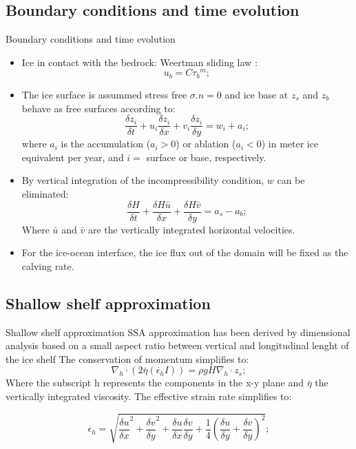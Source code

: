 \documentclass[11pt]{beamer}
\begin{document}
	\subsection{Boundary conditions and time evolution}
		\begin{frame}{Boundary conditions and time evolution}
		\justifying
			\begin{itemize}
				\item Ice in contact with the bedrock: Weertman sliding law \cite[]{weertman1974stability}:
				\begin{equation}
					u_b=C{\tau_b}^m;
				\end{equation}
				\pause \item The ice surface is assummed stress free $\sigma .n=0$ and ice base at $z_s$ and $z_b$ behave as free surfaces according to:
				\begin{equation}
					\frac{\delta z_{i}}{\delta t}+u_{i}\frac{\delta z_{i}}{\delta x}+v_{i}\frac{\delta z_{i}}{\delta y}=w_{i}+a_{i};
				\end{equation}
			where $a_{i}$ is the accumulation ($a_{i}>0$) or ablation ($a_{i}<0$) in meter ice equivalent per year, and $i=$ surface or base, respectively.
			\pause \item By vertical integration of the incompressibility condition, $w$ can be eliminated:
			\begin{equation}
				\frac{\delta H}{\delta t}+\frac{\delta H\bar{u}}{\delta x}+\frac{\delta H \bar{v}}{\delta y}=a_s-a_b ;
			\end{equation}
			Where $\bar{u}$ and $\bar{v}$ are the vertically integrated horizontal velocities. 
			\pause \item For the ice-ocean interface, the ice flux out of the domain will be fixed as the calving rate.
			\end{itemize}
		\end{frame}

	\subsection{Shallow shelf approximation}
		\begin{frame}{Shallow shelf approximation}
			\justifying
			SSA approximation has been derived by dimensional analysis based on a small aspect ratio between vertical and longitudinal lenght of the ice shelf
			The conservation of momentum simplifies to:
			\begin{equation}
				\nabla_h \cdot(2\bar{\eta}(\dot{\epsilon_h}I))=\rho g H \nabla_h \cdot z_s;
			\end{equation}
			Where the subscript h represents the components in the x-y plane and $\bar{\eta}$ the vertically integrated viscosity. The effective strain rate simplifies to:
			
			\begin{equation}
				\dot{\epsilon_h}=\sqrt{{\frac{\delta u}{\delta x}}^2+{\frac{\delta v}{\delta y}}^2+\frac{\delta u}{\delta x}\frac{\delta v}{\delta y}+\frac{1}{4}{(\frac{\delta u}{\delta y}+\frac{\delta v}{\delta y})}^2};
			\end{equation}

		\end{frame}
			
\end{document}
